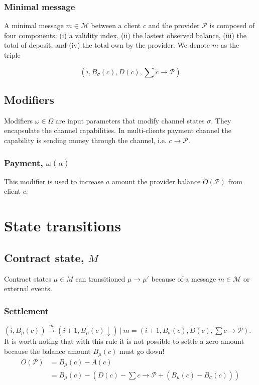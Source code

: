 \documentclass{llncs}
\begin{document}
\subsubsection{Minimal message} A minimal message $m \in \mathcal{M}$ between a client $c$ and the provider $\mathcal{P}$ is composed of four components: (i) a validity index, (ii) the lastest observed balance, (iii) the total of deposit, and (iv) the total own by the provider. We denote $m$ as the triple

$$(i, B_\sigma(c), D(c), \textstyle \sum c \rightarrow \mathcal{P})$$

\subsection{Modifiers} Modifiers $\omega \in \Omega$ are input parameters that modify channel states $\sigma$. They encapsulate the channel capabilities. In multi-clients payment channel the capability is sending money through the channel, i.e. $c \rightarrow \mathcal{P}$.

\subsubsection{Payment, $\omega(a)$} This modifier is used to increase $a$ amount the provider balance $O(\mathcal{P})$ from client $c$.

\section{State transitions}

\subsection{Contract state, $M$} Contract states $\mu \in M$ can transitioned $\mu \rightarrow \mu'$ because of a message $m \in \mathcal{M}$ or external events.

\subsubsection{Settlement} $(i, B_\mu(c)) \xrightarrow{m} (i+1, B_\mu(c)\downarrow)\ |\ m = (i+1, B_\sigma(c), D(c), \sum c \rightarrow \mathcal{P})$. It is worth noting that with this rule it is not possible to settle a zero amount because the balance amount $B_\mu(c)$ must go down!
\begin{equation*}
\begin{split}
    O(\mathcal{P}) &= B_\mu(c) - A(c) \\
    &= B_\mu(c) - (D(c) - \textstyle \sum c \rightarrow \mathcal{P} + (B_\mu(c) - B_\sigma(c))) \\
\end{split}
\end{equation*}
\end{document}
